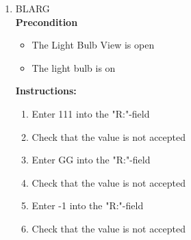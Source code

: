 \documentclass[a4paper]{article}
\newlength{\testlabellength}
\newenvironment{testlist}{\begin{enumerate}[label=\bfseries Instruction \thesubsection.\arabic* , labelindent=0pt, labelwidth=\testlabellength , leftmargin=2cm]}{\end{enumerate}}
\newenvironment{config}[1][2]{
This test should be run #1 times with the following configurations:
\begin{enumerate}[label=\bfseries  \arabic*., labelindent=0cm, labelwidth=2cm , leftmargin=1cm]
}
{\end{enumerate}}
\newenvironment{precondition}{
{\color{white}BLARG}\\ 
\textbf{Precondition}
\begin{itemize}[labelindent=0cm, labelwidth=2cm , leftmargin=1cm]
}
{\end{itemize}}
\newenvironment{instruction}{
\textbf{Instructions:}
\begin{enumerate}[label=\bfseries  \arabic*., labelindent=0cm, labelwidth=2cm , leftmargin=1cm]
}
{\end{enumerate}}
\newenvironment{postcondition}{
\textbf{Postcondition:}
\begin{itemize}[labelindent=0cm, labelwidth=2cm , leftmargin=1cm]
}
{\end{itemize}}
\begin{document}
\begin{appendices}
\begin{testlist}

	\item 
		\begin{precondition}
			\item The Light Bulb View is open
			\item The light bulb is on
		\end{precondition}
		\begin{instruction}
			\item Enter 111 into the "R:"-field
			\item Check that the value is not accepted
			\item Enter GG into the "R:"-field
			\item Check that the value is not accepted
			\item Enter -1 into the "R:"-field
			\item Check that the value is not accepted
		\end{instruction}





\end{testlist}
\end{appendices}
\end{document}
